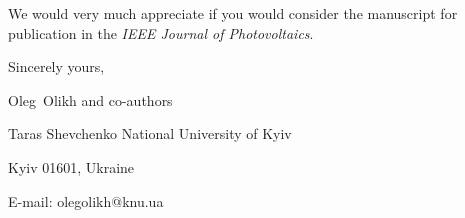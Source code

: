 \documentclass[preprint]{elsarticle}
\begin{document}


We would  very much appreciate if you would consider the manuscript for publication in the \emph{IEEE Journal of Photovoltaics}.

\vspace{3mm}

Sincerely yours,

Oleg~Olikh and co-authors


Taras Shevchenko National University of Kyiv


Kyiv 01601, Ukraine

E-mail: olegolikh@knu.ua


\end{document}
